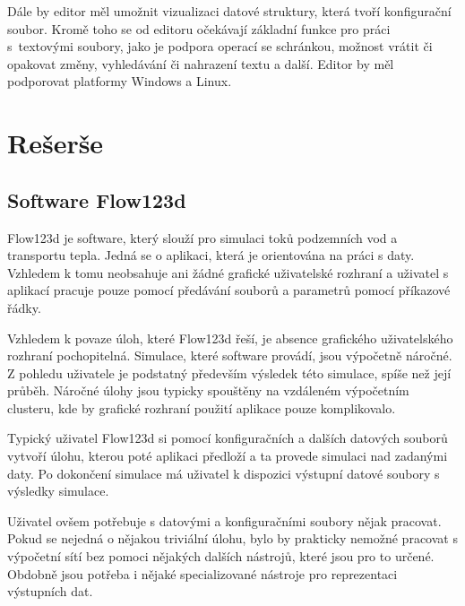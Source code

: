 \documentclass[FM,DP]{tulthesis}
\begin{document}
Dále by editor měl umožnit vizualizaci datové struktury, která tvoří konfigurační soubor. Kromě toho se od editoru očekávají základní funkce pro práci s~textovými soubory, jako je podpora operací se schránkou, možnost vrátit či opakovat změny, vyhledávání či nahrazení textu a další. Editor by měl podporovat platformy Windows a Linux.



\chapter{Rešerše}





\section{Software Flow123d}

Flow123d je software, který slouží pro simulaci toků podzemních vod a transportu tepla. Jedná se o aplikaci, která je orientována na práci s daty. Vzhledem k tomu neobsahuje ani žádné grafické uživatelské rozhraní a uživatel s aplikací pracuje pouze pomocí předávání souborů a parametrů pomocí příkazové řádky.

Vzhledem k povaze úloh, které Flow123d řeší, je absence grafického uživatelského rozhraní pochopitelná. Simulace, které software provádí, jsou výpočetně náročné. Z pohledu uživatele je podstatný především výsledek této simulace, spíše než její průběh. Náročné úlohy jsou typicky spouštěny na vzdáleném výpočetním clusteru, kde by grafické rozhraní použití aplikace pouze komplikovalo.

Typický uživatel Flow123d si pomocí konfiguračních a dalších datových souborů vytvoří úlohu, kterou poté aplikaci předloží a ta provede simulaci nad zadanými daty. Po dokončení simulace má uživatel k dispozici výstupní datové soubory s výsledky simulace.

Uživatel ovšem potřebuje s datovými a konfiguračními soubory nějak pracovat. Pokud se nejedná o nějakou triviální úlohu, bylo by prakticky nemožné pracovat s výpočetní sítí bez pomoci nějakých dalších nástrojů, které jsou pro to určené. Obdobně jsou potřeba i nějaké specializované nástroje pro reprezentaci výstupních dat.
\end{document}
